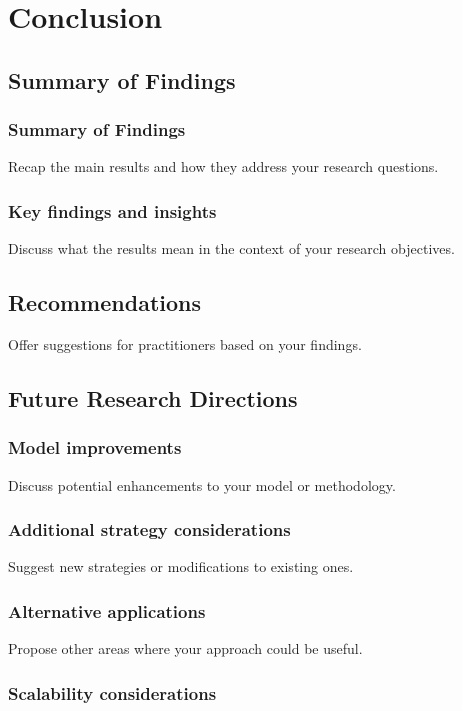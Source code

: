 
\chapter{Conclusion}\label{chapter:conclusion}

\section{Summary of Findings}
\subsection{Summary of Findings}
Recap the main results and how they address your research questions.
\subsection{Key findings and insights}
Discuss what the results mean in the context of your research objectives.

\section{Recommendations}
Offer suggestions for practitioners based on your findings.

\section{Future Research Directions}


\subsection{Model improvements}
Discuss potential enhancements to your model or methodology.

\subsection{Additional strategy considerations}
Suggest new strategies or modifications to existing ones.

\subsection{Alternative applications}
Propose other areas where your approach could be useful.
\subsection{Scalability considerations}



